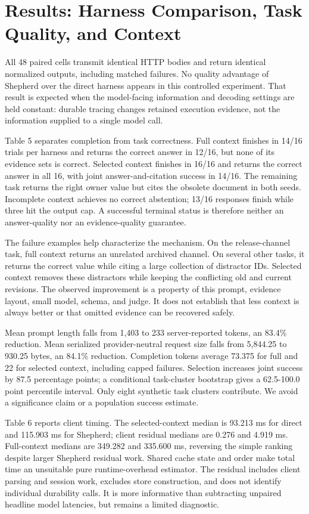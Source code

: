 \documentclass[11pt,a4paper]{article}
\begin{document}
\section{Results: Harness Comparison, Task Quality, and Context}

All 48 paired cells transmit identical HTTP bodies and return identical normalized outputs, including matched failures. No quality advantage of Shepherd over the direct harness appears in this controlled experiment. That result is expected when the model-facing information and decoding settings are held constant: durable tracing changes retained execution evidence, not the information supplied to a single model call.


Table 5 separates completion from task correctness. Full context finishes in 14/16 trials per harness and returns the correct answer in 12/16, but none of its evidence sets is correct. Selected context finishes in 16/16 and returns the correct answer in all 16, with joint answer-and-citation success in 14/16. The remaining task returns the right owner value but cites the obsolete document in both seeds. Incomplete context achieves no correct abstention; 13/16 responses finish while three hit the output cap. A successful terminal status is therefore neither an answer-quality nor an evidence-quality guarantee.


The failure examples help characterize the mechanism. On the release-channel task, full context returns an unrelated archived channel. On several other tasks, it returns the correct value while citing a large collection of distractor IDs. Selected context removes these distractors while keeping the conflicting old and current revisions. The observed improvement is a property of this prompt, evidence layout, small model, schema, and judge. It does not establish that less context is always better or that omitted evidence can be recovered safely.


Mean prompt length falls from 1,403 to 233 server-reported tokens, an 83.4\% reduction. Mean serialized provider-neutral request size falls from 5,844.25 to 930.25 bytes, an 84.1\% reduction. Completion tokens average 73.375 for full and 22 for selected context, including capped failures. Selection increases joint success by 87.5 percentage points; a conditional task-cluster bootstrap gives a 62.5-100.0 point percentile interval. Only eight synthetic task clusters contribute. We avoid a significance claim or a population success estimate.


Table 6 reports client timing. The selected-context median is 93.213 ms for direct and 115.903 ms for Shepherd; client residual medians are 0.276 and 4.919 ms. Full-context medians are 349.282 and 335.600 ms, reversing the simple ranking despite larger Shepherd residual work. Shared cache state and order make total time an unsuitable pure runtime-overhead estimator. The residual includes client parsing and session work, excludes store construction, and does not identify individual durability calls. It is more informative than subtracting unpaired headline model latencies, but remains a limited diagnostic.
\end{document}
